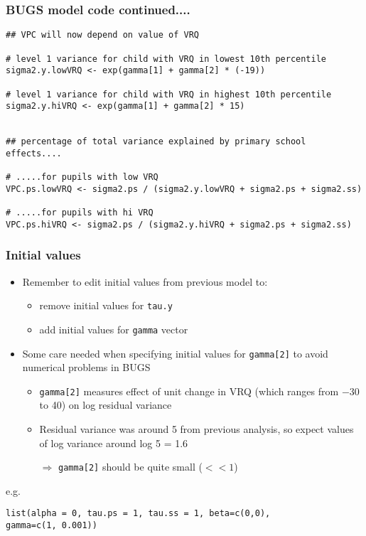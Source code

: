 \documentclass[handout]{beamer}
\begin{document}
\begin{frame}[fragile]
\frametitle{BUGS model code continued....}

\begin{footnotesize}\begin{verbatim}
## VPC will now depend on value of VRQ

# level 1 variance for child with VRQ in lowest 10th percentile
sigma2.y.lowVRQ <- exp(gamma[1] + gamma[2] * (-19))

# level 1 variance for child with VRQ in highest 10th percentile
sigma2.y.hiVRQ <- exp(gamma[1] + gamma[2] * 15)


## percentage of total variance explained by primary school effects....

# .....for pupils with low VRQ
VPC.ps.lowVRQ <- sigma2.ps / (sigma2.y.lowVRQ + sigma2.ps + sigma2.ss)

# .....for pupils with hi VRQ
VPC.ps.hiVRQ <- sigma2.ps / (sigma2.y.hiVRQ + sigma2.ps + sigma2.ss)
\end{verbatim}\end{footnotesize}
\end{frame}
\begin{frame}[fragile]

\frametitle{Initial values}
\begin{itemize}
\item Remember to edit initial values from previous model to:
   \begin{itemize}
   \item remove initial values for {\tt tau.y}
   \item add initial values for {\tt gamma} vector
   \end{itemize}
\item Some care needed when specifying initial values for {\tt gamma[2]}
   to avoid numerical problems in BUGS
   \begin{itemize}
   \item {\tt gamma[2]} measures effect of unit change in VRQ (which ranges
      from $-$30 to 40) on log residual variance
   \item Residual variance was around 5 from previous analysis, so expect
      values of log variance around log 5 = 1.6
   \item[$\Rightarrow$]  {\tt gamma[2]} should be quite small ($<< 1$)
   \end{itemize}
\end{itemize}
e.g.
\begin{verbatim}
list(alpha = 0, tau.ps = 1, tau.ss = 1, beta=c(0,0),
gamma=c(1, 0.001))
\end{verbatim}
\end{frame}
\end{document}
